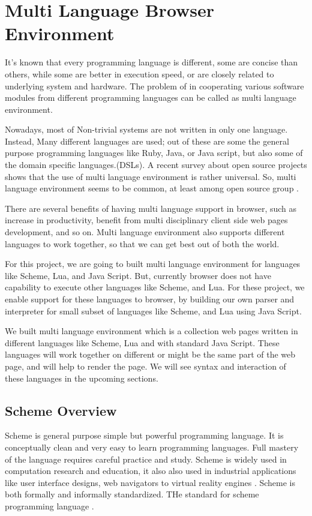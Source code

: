 \section{Multi Language Browser Environment} 

It's known that every programming language is different, some are concise than others, while some are better in execution speed, or are closely related to underlying system and hardware. The problem of in cooperating various software modules from different programming languages can be called as multi language environment.

Nowadays, most of Non-trivial systems are not written in only one language.
Instead, Many different languages are used; out of these are some the general purpose programming languages like Ruby, Java, or Java script, but also some of the domain specific languages.(DSLs). A recent survey about open source projects shows that the use of multi language environment is rather universal. So, multi language environment seems to be common, at least among open source group \cite{Mayer2017}.

There are several benefits of having multi language support in browser, such as increase in productivity, benefit from multi disciplinary client side web pages development, and so on. Multi language environment also supports different languages to work together, so that we can get best out of both the world.

For this project, we are going to built multi language environment for languages like Scheme, Lua, and Java Script. But, currently browser does not have capability to execute other languages like Scheme, and Lua. For these project, we enable support for these languages to browser, by building our own parser and interpreter for small subset of languages like Scheme, and Lua using Java Script. 

We built multi language environment which is a collection web pages written in different languages like Scheme, Lua and with standard Java Script. These languages will work together on different or might be the same part of the web page, and will help to render the page. We will see syntax and interaction of these languages in the upcoming sections. 


\subsection{Scheme Overview}

Scheme is general purpose simple but powerful programming language.
It is conceptually clean and very easy to learn programming languages. Full mastery of the language requires careful practice and study. Scheme is widely used in computation research and education, it also also used in industrial applications like user interface designs, web navigators to virtual reality engines \cite{Dybvig:1996:SPL:525334}. Scheme is both formally and informally standardized. THe standard for scheme programming language \cite{schemeieee}.

